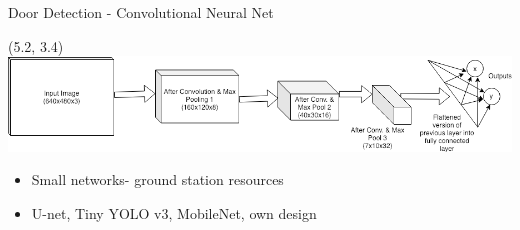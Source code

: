 \documentclass[xcolor=x11names,compress]{beamer}
\begin{document}
\begin{frame}{Door Detection - Convolutional Neural Net}
	\begin{picture}(5.2, 3.4)
        \centering
        \hspace{60pt}\includegraphics[scale=0.20]{arch}
	\end{picture}
	\begin{itemize}
        \item Small networks- ground station resources
        \item U-net, Tiny YOLO v3, MobileNet, own design
	\end{itemize}



\end{frame}
\end{document}

